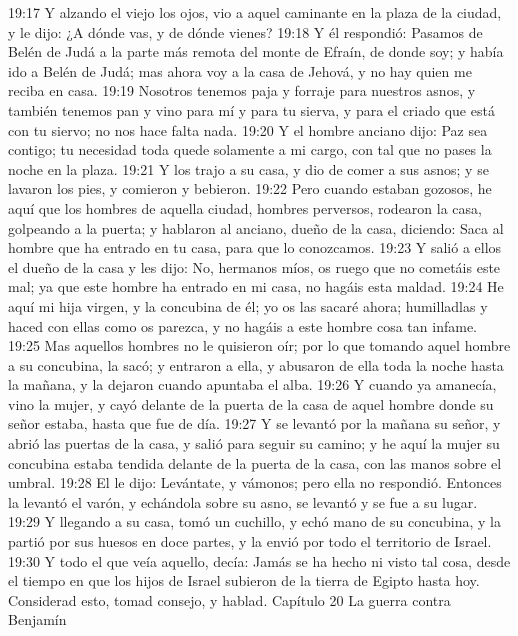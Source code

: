 19:17 Y alzando el viejo los ojos, vio a aquel caminante en la plaza de la ciudad, y le dijo: ¿A dónde vas, y de dónde vienes?  
19:18 Y él respondió: Pasamos de Belén de Judá a la parte más remota del monte de Efraín, de donde soy; y había ido a Belén de Judá; mas ahora voy a la casa de Jehová, y no hay quien me reciba en casa.  
19:19 Nosotros tenemos paja y forraje para nuestros asnos, y también tenemos pan y vino para mí y para tu sierva, y para el criado que está con tu siervo; no nos hace falta nada.  
19:20 Y el hombre anciano dijo: Paz sea contigo; tu necesidad toda quede solamente a mi cargo, con tal que no pases la noche en la plaza.  
19:21 Y los trajo a su casa, y dio de comer a sus asnos; y se lavaron los pies, y comieron y bebieron.  
19:22 Pero cuando estaban gozosos, he aquí que los hombres de aquella ciudad, hombres perversos, rodearon la casa, golpeando a la puerta; y hablaron al anciano, dueño de la casa, diciendo: Saca al hombre que ha entrado en tu casa, para que lo conozcamos.  
19:23 Y salió a ellos el dueño de la casa y les dijo: No, hermanos míos, os ruego que no cometáis este mal; ya que este hombre ha entrado en mi casa, no hagáis esta maldad.  
19:24 He aquí mi hija virgen, y la concubina de él; yo os las sacaré ahora; humilladlas y haced con ellas como os parezca, y no hagáis a este hombre cosa tan infame.  
19:25 Mas aquellos hombres no le quisieron oír; por lo que tomando aquel hombre a su concubina, la sacó; y entraron a ella, y abusaron de ella toda la noche hasta la mañana, y la dejaron cuando apuntaba el alba.  
19:26 Y cuando ya amanecía, vino la mujer, y cayó delante de la puerta de la casa de aquel hombre donde su señor estaba, hasta que fue de día.  
19:27 Y se levantó por la mañana su señor, y abrió las puertas de la casa, y salió para seguir su camino; y he aquí la mujer su concubina estaba tendida delante de la puerta de la casa, con las manos sobre el umbral.  
19:28 El le dijo: Levántate, y vámonos; pero ella no respondió. Entonces la levantó el varón, y echándola sobre su asno, se levantó y se fue a su lugar.  
19:29 Y llegando a su casa, tomó un cuchillo, y echó mano de su concubina, y la partió por sus huesos en doce partes, y la envió por todo el territorio de Israel.  
19:30 Y todo el que veía aquello, decía: Jamás se ha hecho ni visto tal cosa, desde el tiempo en que los hijos de Israel subieron de la tierra de Egipto hasta hoy. Considerad esto, tomad consejo, y hablad.  
Capítulo 20
La guerra contra Benjamín  

